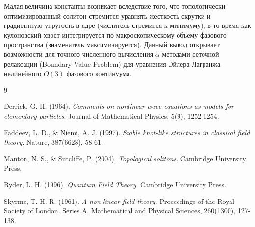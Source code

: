 \documentclass[12pt,a4paper]{article}
\begin{document}
Малая величина константы возникает вследствие того, что топологически оптимизированный солитон стремится уравнять жесткость скрутки и градиентную упругость в ядре (числитель стремится к минимуму), в то время как кулоновский хвост интегрируется по макроскопическому объему фазового пространства (знаменатель максимизируется). Данный вывод открывает возможности для точного численного вычисления $\alpha$ методами сеточной релаксации (Boundary Value Problem) для уравнения Эйлера-Лагранжа нелинейного $O(3)$ фазового континуума.

\begin{thebibliography}{9}

Derrick, G. H. (1964). \textit{Comments on nonlinear wave equations as models for elementary particles}. Journal of Mathematical Physics, 5(9), 1252-1254.

Faddeev, L. D., \& Niemi, A. J. (1997). \textit{Stable knot-like structures in classical field theory}. Nature, 387(6628), 58-61.

Manton, N. S., \& Sutcliffe, P. (2004). \textit{Topological solitons}. Cambridge University Press.

Ryder, L. H. (1996). \textit{Quantum Field Theory}. Cambridge University Press.

Skyrme, T. H. R. (1961). \textit{A non-linear field theory}. Proceedings of the Royal Society of London. Series A. Mathematical and Physical Sciences, 260(1300), 127-138.

\end{thebibliography}
\end{document}
